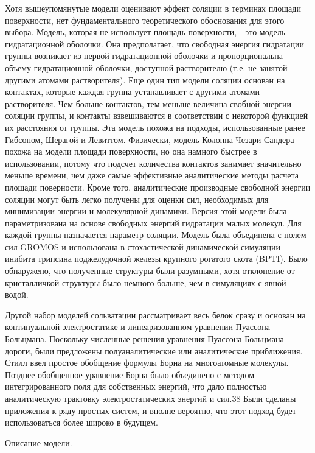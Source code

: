 Хотя вышеупомянутые модели оценивают эффект соляции в терминах площади поверхности, нет фундаментального теоретического обоснования для этого выбора. Модель, которая не использует площадь поверхности, - это модель гидратационной оболочки. Она предполагает, что свободная энергия гидратации группы возникает из первой гидратационной оболочки и пропорциональна объему гидратационной оболочки, доступной растворителю (т.е. не занятой другими атомами растворителя). Еще один тип модели соляции основан на контактах, которые каждая группа устанавливает с другими атомами растворителя. Чем больше контактов, тем меньше величина свобной энергии соляции группы, и контакты взвешиваются в соответствии с некоторой функцией их расстояния от группы. Эта модель похожа на подходы, использованные ранее Гибсоном, Шерагой и Левиттом. Физически, модель Колонна-Чезари-Сандера похожа на модели площади поверхности, но она намного быстрее в использовании, потому что подсчет количества контактов занимает значительно меньше времени, чем даже самые эффективные аналитические методы расчета площади поверности. Кроме того, аналитические производные свободной энергии соляции могут быть легко получены для оценки сил, необходимых для минимизации энергии и молекулярной динамики. Версия этой модели была параметризована на основе свободных энергий гидратации малых молекул. Для каждой группы назначается параметр соляции. Модель была объединена с полем сил GROMOS и использована в стохастической динамической симуляции инибита трипсина поджелудочной железы крупного рогатого скота (BPTI). Было обнаружено, что полученные структуры были разумными, хотя отклонение от кристалличкой структуры было немного больше, чем в симуляциях с явной водой. 

Другой набор моделей сольватации рассматривает весь белок сразу и основан на континуальной электростатике и линеаризованном уравнении Пуассона-Больцмана. Поскольку численные решения уравнения Пуассона-Больцмана дороги, были предложены полуаналитические или аналитические приближения. Стилл ввел простое обобщение формулы Борна на многоатомные молекулы. Позднее обобщенное уравнение Борна было объединено с методом интегрированного поля для собственных энергий, что дало полностью аналитическую трактовку электростатических энергий и сил.38 Были сделаны приложения к ряду простых систем, и вполне вероятно, что этот подход будет использоваться более широко в будущем.

Описание модели.

